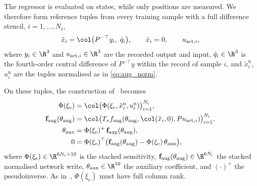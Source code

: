 The regressor is evaluated on states, while only positions are measured.
We therefore form reference tuples from every training sample with a full
difference stencil, $i=1,\dots,N_{\mathrm r}$,
\begin{equation}
 \tilde x_i=\col\bigl(P^{-\top}y_i,\;\dot q_i\bigr),\qquad
 \bar x_i=0,\qquad
 u_{\mathrm{act},i},
 \label{eq:obc_tuples}
\end{equation}
where $y_i\in\R^3$ and $u_{\mathrm{act},i}\in\R^3$ are the recorded output and
input, $\dot q_i\in\R^3$ is the fourth-order central difference of
$P^{-\top}y$ within the record of sample $i$, and
$\tilde x^{\mathrm n}_i$, $u^{\mathrm n}_i$ are the tuples normalised as in
\eqref{eq:aug_norm}.

On these tuples, the construction of~\cite[Eqs.~(8), (10), Lemma~3]{gyorok2026obc}
becomes
\begin{equation}
\begin{aligned}
 \Phi(\xi_{\mathrm e})
 &=\col\bigl(\Phi(\xi_{\mathrm e},\tilde x^{\mathrm n}_i,u^{\mathrm n}_i)\bigr)_{i=1}^{N_{\mathrm r}},\\
 \mathbf f_{\mathrm{aug}}(\theta_{\mathrm{aug}})
 &=\col\bigl(T_xf_{\mathrm{aug}}(\theta_{\mathrm{aug}},\col(\tilde x_i,0),Pu_{\mathrm{act},i})\bigr)_{i=1}^{N_{\mathrm r}},\\
 \theta_{\mathrm{aux}}&=\Phi(\xi_{\mathrm e})^{+}\,\mathbf f_{\mathrm{aug}}(\theta_{\mathrm{aug}}),\\
 0&=\Phi(\xi_{\mathrm e})^\top
 \bigl(\mathbf f_{\mathrm{aug}}(\theta_{\mathrm{aug}})-\Phi(\xi_{\mathrm e})\,\theta_{\mathrm{aux}}\bigr),
\end{aligned}
\label{eq:obc_construction}
\end{equation}
where $\Phi(\xi_{\mathrm e})\in\R^{6N_{\mathrm r}\times10}$ is the stacked
sensitivity, $\mathbf f_{\mathrm{aug}}(\theta_{\mathrm{aug}})\in\R^{6N_{\mathrm r}}$
the stacked normalised network write, $\theta_{\mathrm{aux}}\in\R^{10}$ the
auxiliary coefficient, and $(\cdot)^+$ the pseudoinverse.
As in~\cite[Assumption~1]{gyorok2026obc}, $\Phi(\xi_{\mathrm e})$ must have full
column rank.

